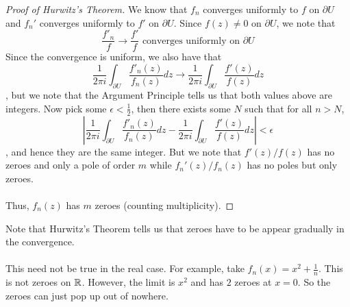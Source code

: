 \begin{proof}[Proof of Hurwitz's Theorem]
    We know that $f_n$ converges uniformly to $f$ on $\partial U$ and $f_n'$ converges uniformly to $f'$ on $\partial U$. Since $f(z) \neq 0$ on $\partial U$, we note that
    \[\frac{f'_n}{f} \to \frac{f'}{f} \text{ converges uniformly on $\partial U$}\]
    Since the convergence is uniform, we also have that
    \[\frac{1}{2\pi i} \int_{\partial U} \frac{f'_n(z)}{f_n(z)} dz \to \frac{1}{2\pi i} \int_{\partial U} \frac{f'(z)}{f(z)} dz\]
    , but we note that the Argument Principle tells us that both values above are integers. Now pick some $\epsilon < \frac{1}{2}$, then there exists some $N$ such that for all $n > N$,
    \[|\frac{1}{2\pi i} \int_{\partial U} \frac{f'_n(z)}{f_n(z)} dz - \frac{1}{2\pi i} \int_{\partial U} \frac{f'(z)}{f(z)} dz| < \epsilon\]
    , and hence they are the same integer. But we note that $f'(z)/f(z)$ has no zeroes and only a pole of order $m$ while $f_n'(z)/f_n(z)$ has no poles but only zeroes.\\\\
    Thus, $f_n(z)$ has $m$ zeroes (counting multiplicity).
\end{proof}

\begin{remark}
    Note that Hurwitz's Theorem tells us that zeroes have to be appear gradually in the convergence.\\\\
    This need not be true in the real case. For example, take $f_n(x) = x^2 + \frac{1}{n}$. This is not zeroes on $\mathbb{R}$. However, the limit is $x^2$ and has $2$ zeroes at $x = 0$. So the zeroes can just pop up out of nowhere.
\end{remark}